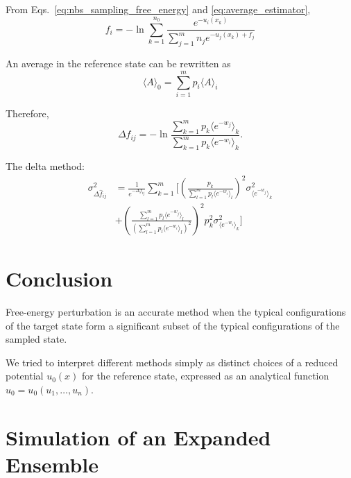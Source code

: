 \documentclass[aip,jcp,reprint,amsmath,amssymb]{revtex4-1}
\begin{document}
From Eqs.~\eqref{eq:nbs_sampling_free_energy} and \eqref{eq:average_estimator},
\begin{equation*}
f_i = -\ln \sum_{k=1}^{n_0} \frac{e^{-u_i(x_k)}}{\sum_{j=1}^m n_j e^{-u_j(x_k) + f_j}}
\end{equation*}

An average in the reference state can be rewritten as
\begin{equation}
\label{eq:average_reference_state}
\langle A \rangle_0 = \sum_{i=1}^m p_i \langle A \rangle_i
\end{equation}

Therefore,
\begin{equation*}
\label{eq:mbar_free_energy_difference}
\Delta f_{ij} = - \ln \frac{\sum_{k=1}^m p_k \langle e^{-w_j} \rangle_k}{\sum_{k=1}^m p_k \langle e^{-w_i} \rangle_k}.
\end{equation*}

The delta method:
\begin{align*}
\sigma^2_{\Delta \hat f_{ij}} &= \frac{1}{e^{-\Delta f_{ij}}} \sum_{k=1}^m \Bigg[ \left(\frac{p_k}{\sum_{l=1}^m p_l \langle e^{-w_i} \rangle_l } \right)^2 \sigma^2_{\langle e^{-w_j} \rangle_k} \\
&+ \left( \frac{\sum_{l=1}^m p_l \langle e^{-w_j} \rangle_l}{(\sum_{l=1}^m p_l \langle e^{-w_i} \rangle_l)^2}\right)^2 p_k^2 \sigma^2_{\langle e^{-w_i} \rangle_k} \Bigg]
\end{align*}

\section{Conclusion}

Free-energy perturbation is an accurate method when the typical configurations of the target state form a significant subset of the typical configurations of the sampled state.

We tried to interpret different methods simply as distinct choices of a reduced potential $u_0(x)$ for the reference state, expressed as an analytical function $u_0 = u_0(u_1,\dots,u_n)$.

\appendix

\section{Simulation of an Expanded Ensemble}
\label{sec:expanded ensemble simulation}
\end{document}
